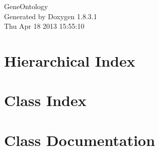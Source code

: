 \documentclass{book}
\begin{document}
\hypersetup{pageanchor=false,citecolor=blue}
\begin{titlepage}
\vspace*{7cm}
\begin{center}
{\Large Gene\-Ontology }\\
\vspace*{1cm}
{\large Generated by Doxygen 1.8.3.1}\\
\vspace*{0.5cm}
{\small Thu Apr 18 2013 15:55:10}\\
\end{center}
\end{titlepage}
\clearemptydoublepage
{}
\tableofcontents
\clearemptydoublepage
{}
\hypersetup{pageanchor=true,citecolor=blue}
\chapter{Hierarchical Index}

\chapter{Class Index}

\chapter{Class Documentation}















\printindex
\end{document}
